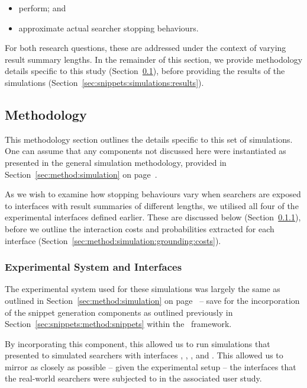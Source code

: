 \begin{itemize}
    \item{ perform; and}
    \item{ approximate actual searcher stopping behaviours.}
\end{itemize}

For both research questions, these are addressed under the context of varying result summary lengths. In the remainder of this section, we provide methodology details specific to this study (Section~\ref{sec:snippets:simulations:method}), before providing the results of the simulations (Section~\ref{sec:snippets:simulations:results}).

\subsection{Methodology}\label{sec:snippets:simulations:method}
This methodology section outlines the details specific to this set of simulations. One can assume that any components not discussed here were instantiated as presented in the general simulation methodology, provided in Section~\ref{sec:method:simulation} on page~\pageref{sec:method:simulation}.

As we wish to examine how stopping behaviours vary when searchers are exposed to interfaces with result summaries of different lengths, we utilised all four of the experimental interfaces defined earlier. These are discussed below (Section~\ref{sec:snippets:simulations:method:interfaces}), before we outline the interaction costs and probabilities extracted for each interface (Section~\ref{sec:method:simulation:grounding:costs}).

\subsubsection{Experimental System and Interfaces}\label{sec:snippets:simulations:method:interfaces}
The experimental system used for these simulations was largely the same as outlined in Section~\ref{sec:method:simulation} on page~\pageref{sec:method:simulation} -- save for the incorporation of the snippet generation components as outlined previously in Section~\ref{sec:snippets:method:snippets} within the \simiir~framework.

By incorporating this component, this allowed us to run simulations that presented to simulated searchers with interfaces , , , and . This allowed us to mirror as closely as possible -- given the experimental setup -- the interfaces that the real-world searchers were subjected to in the associated user study.

